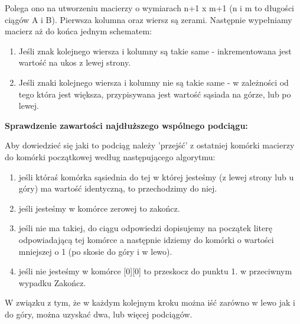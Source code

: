 \documentclass[12pt,a4paper,titlepage]{article}
\begin{document}
	Polega ono na utworzeniu macierzy o wymiarach n+1 x m+1 (n i m to długości ciągów A i B). Pierwsza kolumna oraz wiersz są zerami. Następnie wypełniamy macierz aż do końca jednym schematem: 
	\begin{enumerate}
	\item Jeśli znak kolejnego wiersza i kolumny są takie same - inkrementowana jest wartość na ukos z lewej strony.
	\item Jeśli znaki kolejnego wiersza i kolumny nie są takie same - w zależności od tego która jest większa, przypisywana jest wartość sąsiada na górze, lub po lewej.
	\end{enumerate}
	
	\newpage
	
	\begin{large}
	\textbf{Sprawdzenie zawartości najdłuższego wspólnego podciągu: }
	\newline
	\end{large}
	
	Aby dowiedzieć się jaki to podciąg należy 'przejść' z ostatniej komórki macierzy do komórki początkowej według następującego algorytmu:
\begin{enumerate}
\item jeśli któraś komórka sąsiednia do tej w której jesteśmy (z lewej strony lub u góry) ma wartość identyczną, to przechodzimy do niej.
\item jeśli jesteśmy w komórce zerowej to zakończ.
\item jeśli nie ma takiej, do ciągu odpowiedzi dopisujemy na początek literę odpowiadającą tej komórce a następnie idziemy do komórki o wartości mniejszej o 1 (po skosie do góry i w lewo).
\item jeśli nie jesteśmy w komórce [0][0] to przeskocz do punktu 1. w przeciwnym wypadku Zakończ.
\end{enumerate}

W związku z tym, że w każdym kolejnym kroku można iść zarówno w lewo jak i do góry, można uzyskać dwa, lub więcej podciągów.\newline
\end{document}

